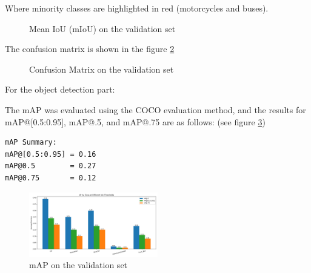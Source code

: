 \documentclass[conference]{IEEEtran}
\begin{document}

Where minority classes are highlighted in red (motorcycles and buses).


\begin{figure}[htbp]
    \centering
    \caption{Mean IoU (mIoU) on the validation set}
    \label{fig:miou}
\end{figure}


The confusion matrix is shown in the figure \ref{fig:confusion}

\begin{figure}[htbp]
    \centering
    \caption{Confusion Matrix on the validation set}
    \label{fig:confusion}
\end{figure}



For the object detection part:

The mAP was evaluated using the COCO evaluation method, and the results for mAP@[0.5:0.95], mAP@.5, and mAP@.75 are as follows: (see figure \ref{fig:mAP})
\begin{verbatim}
mAP Summary:
mAP@[0.5:0.95] = 0.16
mAP@0.5        = 0.27
mAP@0.75       = 0.12
\end{verbatim}

\begin{figure}[htbp]
    \centerline{\includegraphics[width=0.5\textwidth]{matrials/map.png}}
    \caption{mAP on the validation set}
    \label{fig:mAP}
\end{figure}
\end{document}
